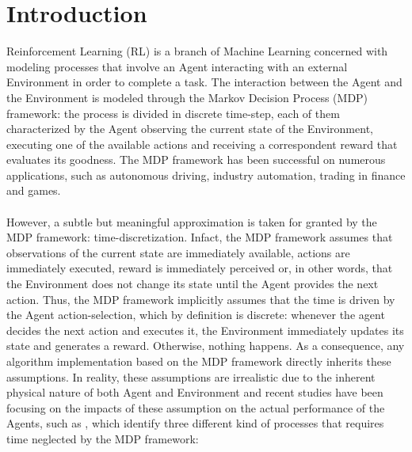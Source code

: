 \chapter{Introduction}
    Reinforcement Learning (RL) is a branch of Machine Learning concerned with modeling processes that involve an Agent interacting with an external Environment in order to complete a task. The interaction between the Agent and the Environment is modeled through the Markov Decision Process (MDP) framework: the process is divided in discrete time-step, each of them characterized by the Agent observing the current state of the Environment, executing one of the available actions and receiving a correspondent reward that evaluates its goodness. The MDP framework has been successful on numerous applications, such as autonomous driving, industry automation, trading in finance and games.
    \\\\
    However, a subtle but meaningful approximation is taken for granted by the MDP framework: time-discretization. Infact, the MDP framework assumes that observations of the current state are immediately available, actions are immediately executed, reward is immediately perceived or, in other words, that the Environment does not change its state until the Agent provides the next action. Thus, the MDP framework implicitly assumes that the time is driven by the Agent action-selection, which by definition is discrete: whenever the agent decides the next action and executes it, the Environment immediately updates its state and generates a reward. Otherwise, nothing happens. As a consequence, any algorithm implementation based on the MDP framework directly inherits these assumptions. In reality, these assumptions are irrealistic due to the inherent physical nature of both Agent and Environment and recent studies have been focusing on the impacts of these assumption on the actual performance of the Agents, such as , which identify three different kind of processes that requires time neglected by the MDP framework:
